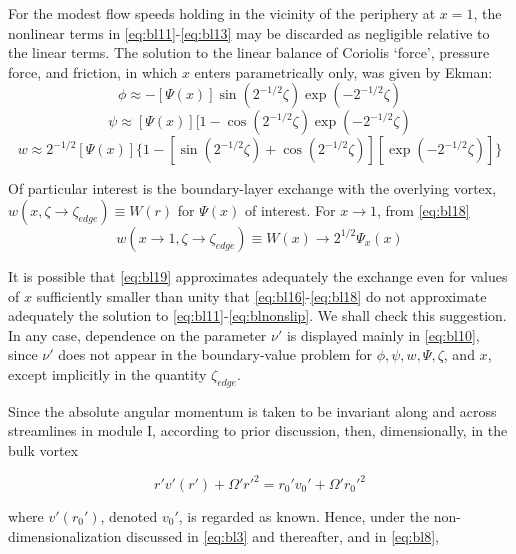 \documentclass[preprint, prX]{revtex4}
\begin{document}
For the modest flow speeds holding in the vicinity of the periphery at $x = 1$, the nonlinear terms in \eqref{eq:bl11}-\eqref{eq:bl13} may be discarded as negligible relative to the linear terms. The solution to the linear balance of Coriolis `force', pressure force, and friction, in which $x$ enters parametrically only, was given by Ekman:
\begin{equation}
\phi \approx -[\Psi(x)]\sin(2^{-1/2}\zeta)\exp(-2^{-1/2}\zeta)
\label{eq:bl16}
\end{equation}
\begin{equation}
\psi \approx [\Psi(x)][1-\cos( 2^{-1/2}\zeta)\exp(-2^{-1/2}\zeta)
\end{equation}
\begin{equation}
w \approx 2^{-1/2} [\Psi(x)]\{1-[\sin(2^{-1/2}\zeta) + \cos(2^{-1/2} \zeta)][\exp(-2^{-1/2}\zeta)]   \}
\label{eq:bl18}
\end{equation}

Of particular interest is the boundary-layer exchange with the overlying vortex,
$w(x, \zeta \rightarrow \zeta_{edge} ) \equiv W(r)$ for $\Psi(x)$ of interest. For $x \rightarrow 1$, from \eqref{eq:bl18}
\begin{equation}
w(x\rightarrow 1, \zeta \rightarrow \zeta_{edge}) \equiv W(x) \rightarrow 2^{1/2} \Psi_x(x)
\label{eq:bl19}
\end{equation}

It is possible that \eqref{eq:bl19} approximates adequately the
exchange even for values of $x$ sufficiently smaller than unity that \eqref{eq:bl16}-\eqref{eq:bl18} do not approximate adequately the solution to \eqref{eq:bl11}-\eqref{eq:blnonslip}. We shall check this suggestion. In any case, dependence on the parameter $\nu'$ is displayed mainly in \eqref{eq:bl10}, since $\nu'$ does not appear in the boundary-value problem for $\phi, \psi, w, \Psi, \zeta$, and $x$, except implicitly in the quantity $\zeta_{edge}$. 

Since the absolute angular momentum is taken to be invariant along and across streamlines in module I, according to prior discussion, then, dimensionally, in the bulk
vortex

\begin{equation}
r'v'(r') + \Omega' r'^2 = r_0' v_0' + \Omega' r_0'^2
\end{equation}

where $v'(r_0')$,  denoted $v_0'$, is regarded as known. Hence, under the non- dimensionalization discussed in \eqref{eq:bl3} and thereafter, and in \eqref{eq:bl8},
\end{document}
